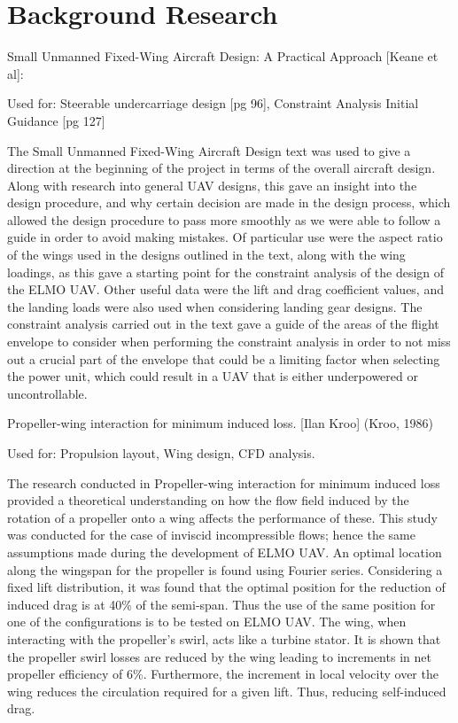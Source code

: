 \documentclass[../../main.tex]{subfiles}
\begin{document}
\chapter{Background Research} \label{chapter:background-research}

Small Unmanned Fixed-Wing Aircraft Design: A Practical Approach [Keane et al]: 

Used for: Steerable undercarriage design [pg 96], Constraint Analysis Initial Guidance [pg 127]  

The Small Unmanned Fixed-Wing Aircraft Design text was used to give a direction at the beginning of the project in terms of the overall aircraft design.
Along with research into general UAV designs, this gave an insight into the design procedure, and why certain decision are made in the design process, which allowed the design procedure to pass more smoothly as we were able to follow a guide in order to avoid making mistakes.
Of particular use were the aspect ratio of the wings used in the designs outlined in the text, along with the wing loadings, as this gave a starting point for the constraint analysis of the design of the ELMO UAV.
Other useful data were the lift and drag coefficient values, and the landing loads were also used when considering landing gear designs.
The constraint analysis carried out in the text gave a guide of the areas of the flight envelope to consider when performing the constraint analysis in order to not miss out a crucial part of the envelope that could be a limiting factor when selecting the power unit, which could result in a UAV that is either underpowered or uncontrollable. 

Propeller-wing interaction for minimum induced loss. [Ilan Kroo] (Kroo, 1986) 

Used for: Propulsion layout, Wing design, CFD analysis. 

The research conducted in Propeller-wing interaction for minimum induced loss provided a theoretical understanding on how the flow field induced by the rotation of a propeller onto a wing affects the performance of these.
This study was conducted for the case of inviscid incompressible flows; hence the same assumptions made during the development of ELMO UAV.
An optimal location along the wingspan for the propeller is found using Fourier series.
Considering a fixed lift distribution, it was found that the optimal position for the reduction of induced drag is at 40\% of the semi-span.
Thus the use of the same position for one of the configurations is to be tested on ELMO UAV.
The wing, when interacting with the propeller’s swirl, acts like a turbine stator.
It is shown that the propeller swirl losses are reduced by the wing leading to increments in net propeller efficiency of 6\%.
Furthermore, the increment in local velocity over the wing reduces the circulation required for a given lift.
Thus, reducing self-induced drag. 
\end{document}
